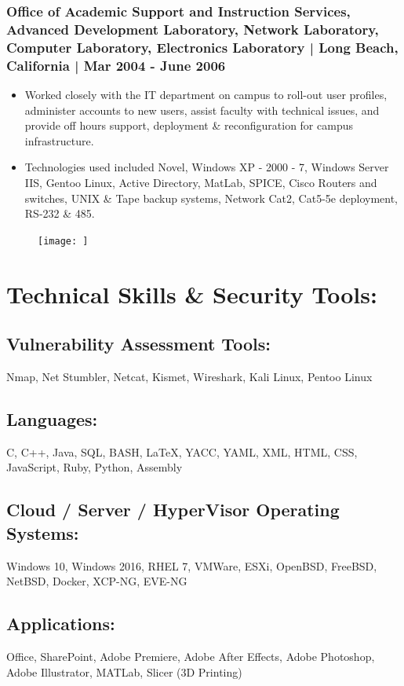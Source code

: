\documentclass[letter,10pt]{article}
\begin{document}
\subsubsection*{Office of Academic Support and Instruction Services, Advanced Development Laboratory, Network Laboratory, Computer Laboratory, Electronics Laboratory | Long Beach, California | Mar 2004 - June 2006}
\label{sec:org95d74f4}
\begin{itemize}
\item Worked closely with the IT department on campus to roll-out user profiles, administer accounts to new users, assist faculty with technical issues, and provide off hours support, deployment \& reconfiguration for campus infrastructure.
\item Technologies used included Novel, Windows XP - 2000 - 7, Windows Server IIS, Gentoo Linux, Active Directory, MatLab, SPICE, Cisco Routers and switches, UNIX \& Tape backup systems, Network Cat2, Cat5-5e deployment, RS-232 \& 485.
\end{itemize}
\begin{figure}
\texttt{[image: ]}
\end{figure}

\section*{Technical Skills \& Security Tools:}
\label{sec:org7090fca}
\subsection*{Vulnerability Assessment Tools:}
\label{sec:orgcf9791b}
Nmap, Net Stumbler, Netcat, Kismet, Wireshark, Kali Linux, Pentoo Linux
\subsection*{Languages:}
\label{sec:org616a6a9}
C, C++, Java, SQL, BASH, \LaTeX{}, YACC, YAML, XML, HTML, CSS, JavaScript, Ruby, Python, Assembly
\subsection*{Cloud / Server / HyperVisor Operating Systems:}
\label{sec:orgee896c1}
Windows 10, Windows 2016, RHEL 7, VMWare, ESXi, OpenBSD, FreeBSD, NetBSD, Docker, XCP-NG, EVE-NG
\subsection*{Applications:}
\label{sec:org1079125}
Office, SharePoint, Adobe Premiere, Adobe After Effects, Adobe Photoshop, Adobe Illustrator, MATLab, Slicer (3D Printing)
\end{document}

